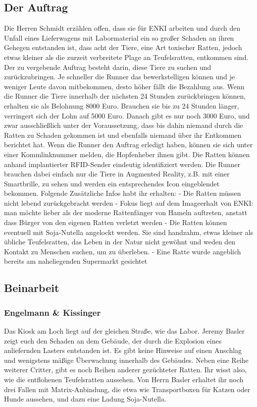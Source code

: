 \documentclass{ShadowTeXSR5}
\begin{document}
\hypertarget{der-auftrag}{%
\subsection{Der Auftrag}\label{der-auftrag}}
Die Herren Schmidt erzählen offen, dass sie für ENKI arbeiten und durch den Unfall eines Lieferwagens mit Labormaterial ein so großer Schaden an ihren Gehegen entstanden ist, dass acht der Tiere, eine Art toxischer Ratten, jedoch etwas kleiner als die zurzeit verbreitete Plage an Teufelsratten, entkommen sind. Der zu vergebende Auftrag besteht darin, diese Tiere zu suchen und zurückzubringen. Je schneller die Runner das bewerkstelligen können und je weniger Leute davon mitbekommen, desto höher fällt die Bezahlung aus.
Wenn die Runner die Tiere innerhalb der nächsten 24 Stunden zurückbringen können, erhalten sie als Belohnung 8000 Euro. Brauchen sie bis zu 24 Stunden länger, verringert sich der Lohn auf 5000 Euro. Danach gibt es nur noch 3000 Euro, und zwar ausschließlich unter der Voraussetzung, dass bis dahin niemand durch die Ratten zu Schaden gekommen ist und ebenfalls niemand über ihr Entkommen berichtet hat. Wenn die Runner den Auftrag erledigt haben, können sie sich unter einer Kommlinknummer melden, die Hopfenheber ihnen gibt.
Die Ratten können anhand implantierter RFID-Sender eindeutig identifiziert werden. Die Runner brauchen dabei einfach nur die Tiere in Augmented Reality, z.B. mit einer Smartbrille, zu sehen und werden ein entsprechendes Icon eingeblendet bekommen. Folgende Zusätzliche Infos habt ihr erhalten: - Die Ratten müssen nicht lebend zurückgebracht werden - Fokus liegt auf dem Imageerhalt von ENKI: man möchte lieber als der moderne Rattenfänger von Hameln auftreten, anstatt dass Bürger von den eigenen Ratten verletzt werden - Die Ratten können eventuell mit Soja-Nutella angelockt werden. Sie sind handzahm, etwas kleiner als übliche Teufelsratten, das Leben in der Natur nicht gewöhnt und weden den Kontakt zu Menschen suchen, um zu überleben. - Eine Ratte wurde angeblich bereits am naheliegenden Supermarkt gesichtet

\hypertarget{beinarbeit}{%
\subsection{Beinarbeit}\label{beinarbeit}}

\hypertarget{engelmann-kissinger}{%
\subsubsection{Engelmann \& Kissinger}\label{engelmann-kissinger}}
Das Kiosk am Loch liegt auf der gleichen Straße, wie das Labor. Jeremy Basler zeigt euch den Schaden an dem Gebäude, der durch die Explosion eines anliefernden Lasters entstanden ist. Es gibt keine Hinweise auf einen Anschlag und wenigstens mäßige Überwachung innerhalb des Gebäudes. Neben eine Reihe weiterer Critter, gibt es noch Reihen anderer gezüchteter Ratten. Ihr wisst also, wie die entflohenen Teufelsratten aussehen. Von Herrn Basler erhaltet ihr noch drei Fallen mit Matrix-Anbindung, die etwa wie Transportboxen für Katzen oder Hunde aussehen, und dazu eine Ladung Soja-Nutella.
\end{document}
